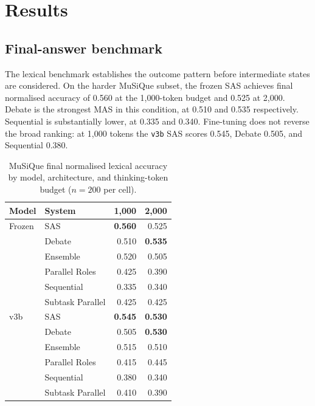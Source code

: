 \chapter{Results}
\label{chap:results}

\section{Final-answer benchmark}

The lexical benchmark establishes the outcome pattern before intermediate states are considered. On the harder MuSiQue subset, the frozen SAS achieves final normalised accuracy of 0.560 at the 1,000-token budget and 0.525 at 2,000. Debate is the strongest MAS in this condition, at 0.510 and 0.535 respectively. Sequential is substantially lower, at 0.335 and 0.340. Fine-tuning does not reverse the broad ranking: at 1,000 tokens the \texttt{v3b} SAS scores 0.545, Debate 0.505, and Sequential 0.380.

\begin{table}[htbp]
  \centering
  \caption[MuSiQue final lexical accuracy]{MuSiQue final normalised lexical accuracy by model, architecture, and thinking-token budget ($n=200$ per cell).}
  \label{tab:musique-lexical}
  \begin{tabular}{@{}llrr@{}}
    \toprule
    Model & System & 1,000 & 2,000 \\
    \midrule
    Frozen & SAS & \textbf{0.560} & 0.525 \\
           & Debate & 0.510 & \textbf{0.535} \\
           & Ensemble & 0.520 & 0.505 \\
           & Parallel Roles & 0.425 & 0.390 \\
           & Sequential & 0.335 & 0.340 \\
           & Subtask Parallel & 0.425 & 0.425 \\
    \addlinespace
    v3b & SAS & \textbf{0.545} & \textbf{0.530} \\
        & Debate & 0.505 & \textbf{0.530} \\
        & Ensemble & 0.515 & 0.510 \\
        & Parallel Roles & 0.415 & 0.445 \\
        & Sequential & 0.380 & 0.340 \\
        & Subtask Parallel & 0.410 & 0.390 \\
    \bottomrule
  \end{tabular}
\end{table}

